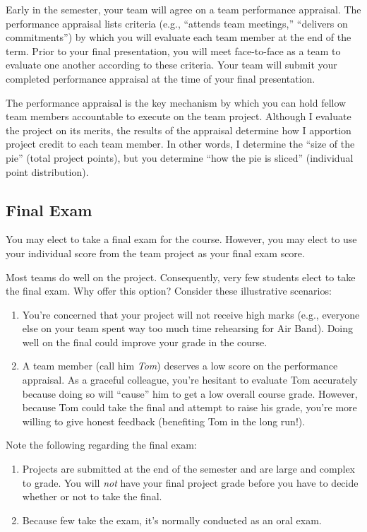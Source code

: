 \documentclass[11pt]{article}
\begin{document}
Early in the semester, your team will agree on a team performance appraisal.
The performance appraisal lists criteria (e.g., ``attends team meetings,''
``delivers on commitments'') by which you will evaluate each team member
at the end of the term.
Prior to your final presentation,
you will meet face-to-face as a team to evaluate one another according to these criteria.
Your team will submit your completed performance appraisal
at the time of your final presentation.

The performance appraisal is the key mechanism
by which you can hold fellow team members accountable to execute on the team project.
Although I evaluate the project on its merits,
the results of the appraisal determine how I apportion project credit
to each team member.
In other words,
I determine the ``size of the pie'' (total project points),
but you determine ``how the pie is sliced'' (individual point distribution).

\subsection{Final Exam}

You may elect to take a final exam for the course.
However, you may elect to use your individual score from the team
project as your final exam score.

Most teams do well on the project.
Consequently, very few students elect to take the final exam.
Why offer this option? Consider these illustrative scenarios:
\begin{enumerate}
\item You're concerned that your project will not receive high marks
  (e.g., everyone else on your team spent way too much time rehearsing for Air Band).
  Doing well on the final could improve your grade in the course.
\item A team member (call him \emph{Tom}) deserves a low score on the performance appraisal.
  As a graceful colleague, you're hesitant to evaluate Tom accurately
  because doing so will ``cause'' him to get a low overall course grade.
  However, because Tom could take the final and attempt to raise his grade,
  you're more willing to give honest feedback (benefiting Tom in the long run!).
\end{enumerate}
Note the following regarding the final exam:
\begin{enumerate}
\item Projects are submitted at the end of the semester
  and are large and complex to grade.
  You will \emph{not} have your final project grade
  before you have to decide whether or not to take the final.
\item Because few take the exam, it's normally conducted as an oral exam.
\end{enumerate}
\end{document}
